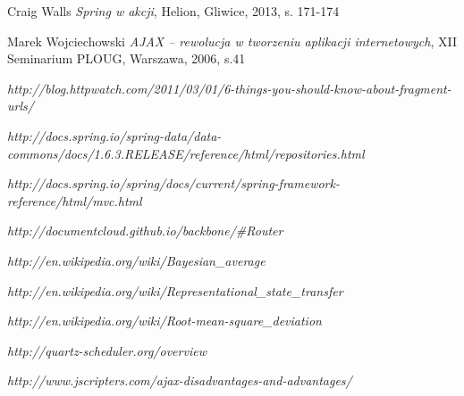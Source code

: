 \begin{thebibliography}{99}

	Craig Walls
	\emph{Spring w akcji},
	Helion,
	Gliwice, 2013,
	s. 171-174
	
	Marek Wojciechowski
	\emph{AJAX – rewolucja w tworzeniu aplikacji internetowych},
	XII Seminarium PLOUG,
	Warszawa, 2006,
	s.41

	\emph{http://blog.httpwatch.com/2011/03/01/6-things-you-should-know-about-fragment-urls/}

	\emph{http://docs.spring.io/spring-data/data-commons/docs/1.6.3.RELEASE/reference/html/repositories.html}

	\emph{http://docs.spring.io/spring/docs/current/spring-framework-reference/html/mvc.html}
	
	\emph{http://documentcloud.github.io/backbone/\#Router}

	\emph{http://en.wikipedia.org/wiki/Bayesian\_average}
	
	\emph{http://en.wikipedia.org/wiki/Representational\_state\_transfer}	
		
	\emph{http://en.wikipedia.org/wiki/Root-mean-square\_deviation}
 
	\emph{http://quartz-scheduler.org/overview}

	\emph{http://www.jscripters.com/ajax-disadvantages-and-advantages/}

\end{thebibliography}
